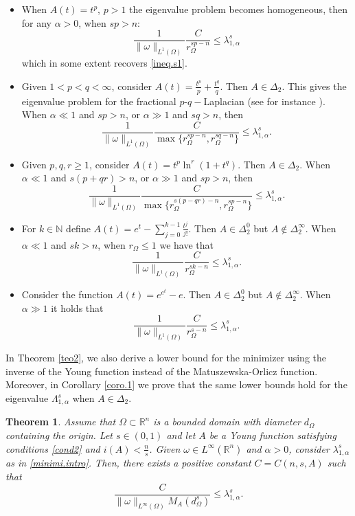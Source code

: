 \documentclass[12pt,reqno]{amsart}
\newtheorem{thm}{Theorem}[section]
\theoremstyle{definition}
\theoremstyle{remark}
\numberwithin{equation}{section}
\begin{document}
\begin{itemize}
\item[i)] When $A(t)=t^p$, $p>1$ the eigenvalue problem becomes homogeneous, then for any $\alpha>0$, when $sp>n$:
$$
\frac{1}{\|\omega\|_{L^1(\Omega)}} \frac{C}{r_\Omega^{sp-n}} \le \lambda_{1,\alpha}^s
$$
which in some extent  recovers \eqref{ineq.s1}.

\medskip

\item[ii)]  Given $1<p<q<\infty$, consider $A(t)=\frac{t^p}{p} + \frac{t^q}{q}$. Then $A\in \Delta_2$. This gives the eigenvalue problem for the fractional $p$-$q-$Laplacian (see for instance \cite{ambrosio}).  When $\alpha\ll1$  and $sp>n$, or $\alpha\gg1$ and $sq>n$, then 
$$
\frac{1}{\|\omega\|_{L^1(\Omega)}} \frac{C}{\max\{r_\Omega^{sp-n},r_\Omega^{sq-n}\}} \le \lambda_{1,\alpha}^s.
$$

\medskip

\item[iii)]  Given $p,q,r\geq 1$, consider $A(t)=t^p \ln^r (1+t^q)$.  Then $A\in \Delta_2$. When $\alpha\ll1$  and $s(p+qr)>n$, or $\alpha\gg1$ and $sp>n$, then 
$$
\frac{1}{\|\omega\|_{L^1(\Omega)}} \frac{C}{\max\{r_\Omega^{s(p-qr)-n},r_\Omega^{sp-n}\}} \le \lambda_{1,\alpha}^s.
$$
\medskip

\item[iv)]  For $k\in\mathbb{N}$ define $\displaystyle A(t)=e^t - \sum_{j=0}^{k-1} \frac{t^j}{j!}$. Then $A\in \Delta_2^0$ but $A\notin \Delta_2^\infty$. When $\alpha\ll1$ and $sk>n$, when $r_\Omega \leq 1$ we have that
$$
\frac{1}{\|\omega\|_{L^1(\Omega)}} \frac{C}{r_\Omega^{sk-n}} \le \lambda_{1,\alpha}^s.
$$

\medskip

\item[v)] Consider the function $A(t)=e^{e^t}- e$. Then $A\in \Delta_2^0$ but $A\notin \Delta_2^\infty$. When $\alpha\gg1$ it holds that
$$
\frac{1}{\|\omega\|_{L^1(\Omega)}} \frac{C}{r_\Omega^{s-n}} \le \lambda_{1,\alpha}^s.
$$
\end{itemize}


In Theorem \ref{teo2}, we also  derive a lower bound for the minimizer using the inverse of the Young function instead of the Matuszewska-Orlicz function. Moreover, in Corollary \ref{coro.1} we prove that the same lower bounds hold for the eigenvalue $\Lambda_{1,\alpha}^s$ when $A\in \Delta_2$.
  

\begin{thm} \label{teo2.intro}
Assume that $\Omega\subset\mathbb{R}^n$ is a bounded domain with diameter $d_\Omega$ containing the origin. Let $s\in (0,1)$ and let $A$ be a Young function satisfying conditions \eqref{cond2} and $i(A)<\frac{n}{s}$. Given  $\omega\in L^\infty(\mathbb{R}^n)$ and $\alpha>0$, consider $\lambda_{1,\alpha}^s$ as in \eqref{minimi.intro}. Then, there exists a positive constant $C=C(n,s,A)$ such that
$$
\frac{C}{\|\omega\|_{L^\infty(\Omega)} M_A(d_\Omega^s) }\leq \lambda_{1,\alpha}^s.
$$
\end{thm}
\end{document}
